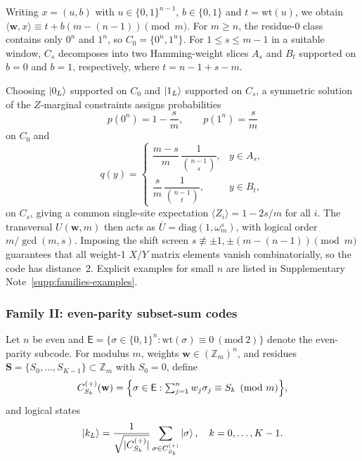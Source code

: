 \documentclass[pdflatex,sn-nature]{sn-jnl}%
\theoremstyle{thmstyleone}%
\theoremstyle{thmstyletwo}%
\theoremstyle{thmstylethree}%
\begin{document}
Writing $x=(u,b)$ with $u\in\{0,1\}^{n-1}$, $b\in\{0,1\}$ and $t=\mathrm{wt}(u)$, we obtain
$\langle \mathbf w,x\rangle\equiv t + b(m-(n-1)) \pmod m$. For $m\ge n$, the residue-$0$ class contains only $0^n$ and $1^n$, so $C_0=\{0^n,1^n\}$. For $1\le s\le m-1$ in a suitable window, $C_s$ decomposes into two Hamming-weight slices $A_s$ and $B_t$ supported on $b=0$ and $b=1$, respectively, where $t=n-1+s-m$.

Choosing $\ket{0_L}$ supported on $C_0$ and $\ket{1_L}$ supported on $C_s$, a symmetric solution of the $Z$-marginal constraints assigns probabilities
\[
  p(0^n)=1-\frac{s}{m},\qquad p(1^n)=\frac{s}{m}
\]
on $C_0$ and
\[
  q(y)=
  \begin{cases}
    \dfrac{m-s}{m}\,\dfrac{1}{\binom{n-1}{s}}, & y\in A_s,\\[4pt]
    \dfrac{s}{m}\,\dfrac{1}{\binom{n-1}{t}},   & y\in B_t,
  \end{cases}
\]
on $C_s$, giving a common single-site expectation
$\langle Z_i\rangle=1-2s/m$ for all $i$. The transversal
$U(\mathbf w,m)$ then acts as
$\overline U=\mathrm{diag}(1,\omega_m^s)$, with logical order
$m/\gcd(m,s)$. Imposing the shift screen
$s\not\equiv\pm1,\pm(m-(n-1))\pmod m$ guarantees that all weight-1 $X/Y$ matrix elements vanish combinatorially, so the code has distance~2. Explicit examples for small $n$ are listed in Supplementary Note~\ref{supp:families-examples}.


\subsubsection{Family II: even-parity subset-sum codes}
\label{subsubsec:proof_family_2}
Let $n$ be even and
$\mathsf E=\{\sigma\in\{0,1\}^n:\mathrm{wt}(\sigma)\equiv 0\ (\mathrm{mod}\ 2)\}$ denote the even-parity subcode. For modulus $m$, weights $\mathbf w\in(\mathbb Z_m)^n$, and residues $\mathbf S=\{S_0,\dots,S_{K-1}\}\subset\mathbb Z_m$ with $S_0=0$, define
\[
  C^{(+)}_{S_k}(\mathbf w)
  =\Bigl\{\sigma\in\mathsf E:\textstyle\sum_{j=1}^n w_j\sigma_j\equiv S_k\pmod m\Bigr\},
\]
and logical states
\[
  \ket{k_L}=\frac{1}{\sqrt{|C^{(+)}_{S_k}|}}\sum_{\sigma\in C^{(+)}_{S_k}}\ket{\sigma},\quad k=0,\dots,K-1.
\]
\end{document}
